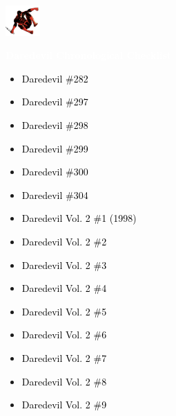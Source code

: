 \documentclass[12pt]{article}
\newcommand{\checkbox}{\raisebox{0.0ex}{\fbox{\rule{0ex}{1.5ex} \rule{1.5ex}{0ex}}}}
\begin{document}
\begin{center}
    \vspace*{2cm}
    \includegraphics[width=0.1\textwidth]{daredevil1.png}
    \vspace{0.3cm}

    {\Huge \textbf{\textcolor{white}{Daredevil Chronological Checklist}}}
\end{center}

\vspace{0.3cm}
\noindent
\begin{tcolorbox}[
  colback=white!95!gray,
  colframe=black,
  width=\textwidth,
  arc=4mm,
  auto outer arc,
  boxrule=0.8pt,
  left=8pt,right=8pt,top=8pt,bottom=8pt
]
\begin{itemize}[left=0pt,label={\checkbox}]
    \item \textcolor{black}{Daredevil \#282}
    \item \textcolor{black}{Daredevil \#297}
    \item \textcolor{black}{Daredevil \#298}
    \item \textcolor{black}{Daredevil \#299}
    \item \textcolor{black}{Daredevil \#300}
    \item \textcolor{black}{Daredevil \#304}
    \item \textcolor{black}{Daredevil Vol. 2 \#1 (1998)}
    \item \textcolor{black}{Daredevil Vol. 2 \#2}
    \item \textcolor{black}{Daredevil Vol. 2 \#3}
    \item \textcolor{black}{Daredevil Vol. 2 \#4}
    \item \textcolor{black}{Daredevil Vol. 2 \#5}
    \item \textcolor{black}{Daredevil Vol. 2 \#6}
    \item \textcolor{black}{Daredevil Vol. 2 \#7}
    \item \textcolor{black}{Daredevil Vol. 2 \#8}
    \item \textcolor{black}{Daredevil Vol. 2 \#9}
\end{itemize}
\end{tcolorbox}
\end{document}
